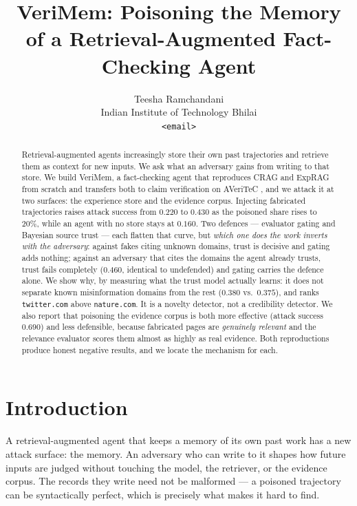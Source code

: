 \documentclass[11pt]{article}
\title{VeriMem: Poisoning the Memory of a Retrieval-Augmented Fact-Checking Agent}
\author{
  Teesha Ramchandani \\
  Indian Institute of Technology Bhilai \\
  \texttt{<email>}
}
\begin{document}
\maketitle

\begin{abstract}
Retrieval-augmented agents increasingly store their own past trajectories and
retrieve them as context for new inputs. We ask what an adversary gains from
writing to that store. We build VeriMem, a fact-checking agent that reproduces
CRAG \citep{yan2024crag} and ExpRAG \citep{ferraz2026exprag} from scratch and
transfers both to claim verification on AVeriTeC \citep{schlichtkrull2023averitec},
and we attack it at two surfaces: the experience store and the evidence corpus.
Injecting fabricated trajectories raises attack success from $0.220$ to $0.430$
as the poisoned share rises to 20\%, while an agent with no store stays at
$0.160$. Two defences --- evaluator gating and Bayesian source trust --- each
flatten that curve, but \emph{which one does the work inverts with the
adversary}: against fakes citing unknown domains, trust is decisive and gating
adds nothing; against an adversary that cites the domains the agent already
trusts, trust fails completely ($0.460$, identical to undefended) and gating
carries the defence alone. We show why, by measuring what the trust model
actually learns: it does not separate known misinformation domains from the rest
($0.380$ vs.\ $0.375$), and ranks \texttt{twitter.com} above \texttt{nature.com}.
It is a novelty detector, not a credibility detector. We also report that
poisoning the evidence corpus is both more effective (attack success $0.690$)
and less defensible, because fabricated pages are \emph{genuinely relevant} and
the relevance evaluator scores them almost as highly as real evidence. Both
reproductions produce honest negative results, and we locate the mechanism for
each.
\end{abstract}

\section{Introduction}

A retrieval-augmented agent that keeps a memory of its own past work has a new
attack surface: the memory. An adversary who can write to it shapes how future
inputs are judged without touching the model, the retriever, or the evidence
corpus. The records they write need not be malformed --- a poisoned trajectory
can be syntactically perfect, which is precisely what makes it hard to find.
\end{document}
